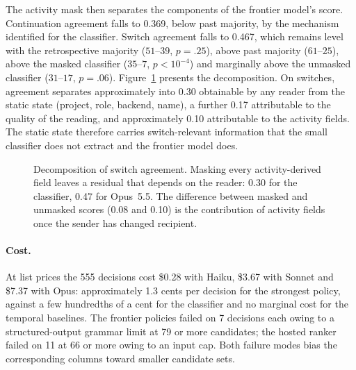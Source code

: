 \documentclass[11pt]{article}
\theoremstyle{definition}
\newcommand{\agr}[1]{A_{#1}}
\begin{document}
The activity mask then separates the components of the frontier model's score. Continuation agreement falls to 0.369, below past majority, by the mechanism identified for the classifier. Switch agreement falls to 0.467, which remains level with the retrospective majority ($51$--$39$, $p = .25$), above past majority ($61$--$25$), above the masked classifier ($35$--$7$, $p<10^{-4}$) and marginally above the unmasked classifier ($31$--$17$, $p = .06$). Figure~\ref{fig:ladder} presents the decomposition. On switches, agreement separates approximately into 0.30 obtainable by any reader from the static state (project, role, backend, name), a further 0.17 attributable to the quality of the reading, and approximately 0.10 attributable to the activity fields. The static state therefore carries switch-relevant information that the small classifier does not extract and the frontier model does.

\begin{figure}[t]
\centering
{}
\caption{Decomposition of switch agreement. Masking every activity-derived field leaves a residual that depends on the reader: 0.30 for the classifier, 0.47 for Opus~5.5. The difference between masked and unmasked scores (0.08 and 0.10) is the contribution of activity fields once the sender has changed recipient.}
\label{fig:ladder}
\end{figure}

\paragraph{Cost.}
At list prices the 555 decisions cost \$0.28 with Haiku, \$3.67 with Sonnet and \$7.37 with Opus: approximately 1.3 cents per decision for the strongest policy, against a few hundredths of a cent for the classifier and no marginal cost for the temporal baselines. The frontier policies failed on 7 decisions each owing to a structured-output grammar limit at 79 or more candidates; the hosted ranker failed on 11 at 66 or more owing to an input cap. Both failure modes bias the corresponding columns toward smaller candidate sets.
\end{document}
